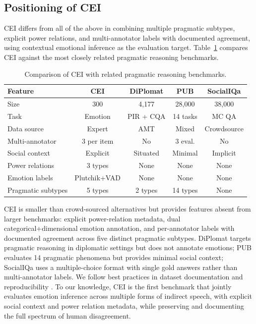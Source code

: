 \documentclass[twoside,11pt]{article}
\begin{document}
\subsection{Positioning of CEI}

CEI differs from all of the above in combining multiple pragmatic subtypes, explicit power relations, and multi-annotator labels with documented agreement, using contextual emotional inference as the evaluation target. Table~\ref{tab:benchmark-comparison} compares CEI against the most closely related pragmatic reasoning benchmarks.

\begin{table}[t]
\centering
\caption{Comparison of CEI with related pragmatic reasoning benchmarks.}
\label{tab:benchmark-comparison}
\small
\begin{tabular}{@{}lcccc@{}}
\toprule
\textbf{Feature} & \textbf{CEI} & \textbf{DiPlomat} & \textbf{PUB} & \textbf{SocialIQa} \\
\midrule
Size & 300 & 4,177 & 28,000 & 38,000 \\
Task & Emotion & PIR + CQA & 14 tasks & MC QA \\
Data source & Expert & AMT & Mixed & Crowdsource \\
Multi-annotator & 3 per item & No & 3 eval. & No \\
Social context & Explicit & Situated & Minimal & Implicit \\
Power relations & 3 types & None & None & None \\
Emotion labels & Plutchik+VAD & None & None & None \\
Pragmatic subtypes & 5 types & 2 types & 14 types & None \\
\bottomrule
\end{tabular}
\end{table}

CEI is smaller than crowd-sourced alternatives but provides features absent from larger benchmarks: explicit power-relation metadata, dual categorical+dimensional emotion annotation, and per-annotator labels with documented agreement across five distinct pragmatic subtypes. DiPlomat \citep{hyun2023diplomat} targets pragmatic reasoning in diplomatic settings but does not annotate emotions; PUB evaluates 14 pragmatic phenomena but provides minimal social context; SocialIQa \citep{sap2019socialiqa} uses a multiple-choice format with single gold answers rather than multi-annotator labels. We follow best practices in dataset documentation \citep{gebru2021datasheets,bender2018data} and reproducibility \citep{pineau2021improving}. To our knowledge, CEI is the first benchmark that jointly evaluates emotion inference across multiple forms of indirect speech, with explicit social context and power relation metadata, while preserving and documenting the full spectrum of human disagreement.
\end{document}
